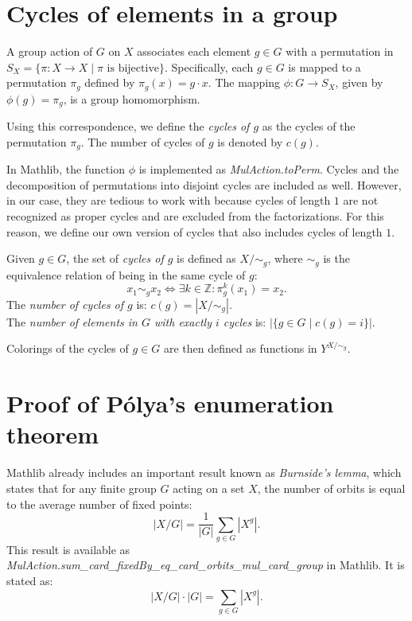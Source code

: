 \section{Cycles of elements in a group}

A group action of $G$ on $X$ associates each element $g \in G$ with a permutation in $S_X = \{\pi : X \to X \mid \pi \text{ is bijective}\}$. Specifically, each $g \in G$ is mapped to a permutation $\pi_g$ defined by $\pi_g(x) = g \cdot x$. The mapping $\phi : G \to S_X$, given by $\phi(g) = \pi_g$, is a group homomorphism. 

Using this correspondence, we define the \emph{cycles of $g$} as the cycles of the permutation $\pi_g$. The number of cycles of $g$ is denoted by $c(g)$.

In Mathlib, the function $\phi$ is implemented as \emph{MulAction.toPerm}. Cycles and the decomposition of permutations into disjoint cycles are included as well. However, in our case, they are tedious to work with because cycles of length $1$ are not recognized as proper cycles and are excluded from the factorizations. For this reason, we define our own version of cycles that also includes cycles of length $1$.

\begin{definition}
  \label{def:CyclesOfGroup}
  \leanok
  Given $g \in G$, the set of \emph{cycles of $g$} is defined as $X / \sim_g$, where $\sim_g$ is the equivalence relation of being in the same cycle of $g$:
  \begin{equation*}
    x_1 \sim_g x_2 \iff \exists k \in \mathbb{Z}: \pi_g^k(x_1) = x_2.
  \end{equation*}
  The \emph{number of cycles of $g$} is: $c(g) = |X / \sim_g|$.\\
  The \emph{number of elements in $G$ with exactly $i$ cycles} is: $|\{g \in G \mid c(g) = i\}|$.
\end{definition}

Colorings of the cycles of $g \in G$ are then defined as functions in $Y^{X / \sim_g}$.

\section{Proof of Pólya's enumeration theorem}

Mathlib already includes an important result known as \emph{Burnside's lemma}, which states that for any finite group $G$ acting on a set $X$, the number of orbits is equal to the average number of fixed points:
\begin{equation*}
  |X/G| = \frac{1}{|G|} \sum_{g \in G} |X^g|.
\end{equation*}
This result is available as \emph{MulAction.sum\_card\_fixedBy\_eq\_card\_orbits\_mul\_card\_group} in Mathlib. It is stated as:
\begin{equation*}
  |X/G| \cdot |G| = \sum_{g \in G} |X^g|.
\end{equation*}

